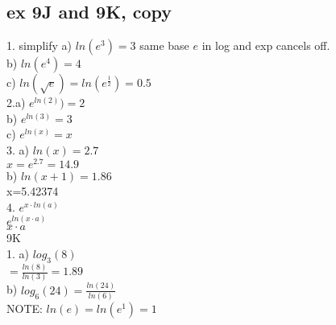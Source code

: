 \documentclass{article}
\begin{document}
  \subsection{ex 9J and 9K, copy}
  1. simplify a) $ln(e^3)=3$
  same base $e$ in log and exp cancels off.\\
  b) $ln(e^4)=4$\\
  c) $ln(\sqrt{e})=ln(e^\frac{1}{2})=0.5$\\
  2.a) $e^{ln(2)})=2$\\
  b) $e^{ln(3)}=3$\\
  c) $e^{ln(x)}=x$\\
  3. a) $ln(x)=2.7$\\
  $x=e^{2.7}=14.9$\\
  b) $ln(x+1)=1.86$\\
  x=5.42374\\
  4. $e^{x\cdot ln(a)}$\\
  $e^{ln(x\cdot a)}$\\
  $x\cdot a$\\
  9K\\
  1. a) $log_3(8)$\\
  $=\frac{ln(8)}{ln(3)}=1.89$\\
  b) $log_6(24)=\frac{ln(24)}{ln(6)}$\\

  NOTE: $ln(e)=ln(e^1)=1$\\


   
\end{document}
